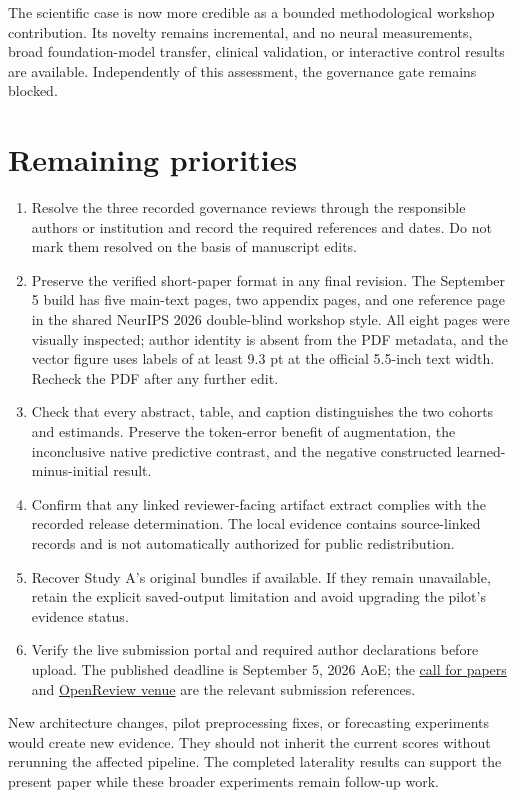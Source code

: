 \documentclass[11pt,letterpaper]{article}
\providecommand{\tightlist}{\setlength{\itemsep}{0pt}\setlength{\parskip}{0pt}}
\begin{document}
The scientific case is now more credible as a bounded methodological
workshop contribution. Its novelty remains incremental, and no neural
measurements, broad foundation-model transfer, clinical validation, or
interactive control results are available. Independently of this
assessment, the governance gate remains blocked.

\section{Remaining priorities}\label{remaining-priorities}

\begin{enumerate}
\def\labelenumi{\arabic{enumi}.}
\tightlist
\item
  Resolve the three recorded governance reviews through the responsible
  authors or institution and record the required references and dates.
  Do not mark them resolved on the basis of manuscript edits.
\item
  Preserve the verified short-paper format in any final revision. The
  September 5 build has five main-text pages, two appendix pages, and
  one reference page in the shared NeurIPS 2026 double-blind workshop
  style. All eight pages were visually inspected; author identity is
  absent from the PDF metadata, and the vector figure uses labels of at
  least 9.3 pt at the official 5.5-inch text width. Recheck the PDF
  after any further edit.
\item
  Check that every abstract, table, and caption distinguishes the two
  cohorts and estimands. Preserve the token-error benefit of
  augmentation, the inconclusive native predictive contrast, and the
  negative constructed learned-minus-initial result.
\item
  Confirm that any linked reviewer-facing artifact extract complies with
  the recorded release determination. The local evidence contains
  source-linked records and is not automatically authorized for public
  redistribution.
\item
  Recover Study A's original bundles if available. If they remain
  unavailable, retain the explicit saved-output limitation and avoid
  upgrading the pilot's evidence status.
\item
  Verify the live submission portal and required author declarations
  before upload. The published deadline is September 5, 2026 AoE; the
  \href{https://brainbodyfm-workshop.github.io/call-for-papers.html}{call
  for papers} and
  \href{https://openreview.net/group?id=NeurIPS.cc/2026/Workshop/BrainBodyFM}{OpenReview
  venue} are the relevant submission references.
\end{enumerate}

New architecture changes, pilot preprocessing fixes, or forecasting
experiments would create new evidence. They should not inherit the
current scores without rerunning the affected pipeline. The completed
laterality results can support the present paper while these broader
experiments remain follow-up work.
\end{document}
